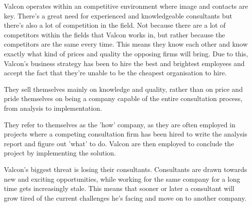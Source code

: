 \label{app:valcon_environment}
Valcon operates within an competitive environment where image and contacts are key. 
There's a great need for experienced and knowledgeable consultants but there's also a lot of competition in the field.
Not because there are a lot of competitors within the fields that Valcon works in, but rather because the competitors are the same every time.
This means they know each other and know exactly what kind of prices and quality the opposing firms will bring.
Due to this, Valcon's business strategy has been to hire the best and brightest employees and accept the fact that they're unable to be the cheapest organisation to hire.

They sell themselves mainly on knowledge and quality, rather than on price and pride themselves on being a company capable of the entire consultation process, from analysis to implementation.

They refer to themselves as the 'how' company, as they are often employed in projects where a competing consultation firm has been hired to write the analysis report and figure out 'what' to do. 
Valcon are then employed to conclude the project by implementing the solution.

Valcon's biggest threat is losing their consultants.
Consultants are drawn towards new and exciting opportunities, while working for the same company for a long time gets increasingly stale.
This means that sooner or later a consultant will grow tired of the current challenges he's facing and move on to another company.